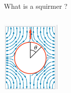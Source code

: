 \documentclass{beamer}
\begin{document}
\begin{frame}{What is a squirmer ?}
\begin{columns}[T]
\begin{column}{0.5\textwidth}
            \includegraphics[width=\textwidth]{../images/squirmer.png}
            \cite{Wikipedia}
        \end{column}
    \end{columns}
\end{frame}
\end{document}
